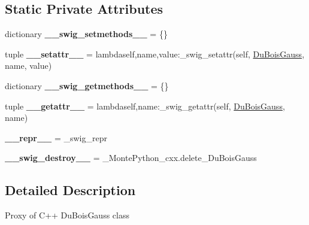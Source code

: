 \subsection*{Static Private Attributes}
\begin{DoxyCompactItemize}
\item 
\hypertarget{classMontePython__cxx_1_1DuBoisGauss_a433eaf202c7a171fb7498e6e7e54da9a}{}dictionary {\bfseries \+\_\+\+\_\+swig\+\_\+setmethods\+\_\+\+\_\+} = \{\}\label{classMontePython__cxx_1_1DuBoisGauss_a433eaf202c7a171fb7498e6e7e54da9a}

\item 
\hypertarget{classMontePython__cxx_1_1DuBoisGauss_a89306da6dc501c11a27108b24e1edf35}{}tuple {\bfseries \+\_\+\+\_\+setattr\+\_\+\+\_\+} = lambdaself,name,value\+:\+\_\+swig\+\_\+setattr(self, \hyperlink{classMontePython__cxx_1_1DuBoisGauss}{Du\+Bois\+Gauss}, name, value)\label{classMontePython__cxx_1_1DuBoisGauss_a89306da6dc501c11a27108b24e1edf35}

\item 
\hypertarget{classMontePython__cxx_1_1DuBoisGauss_ad886a66d3ab5c237fe5ac7d55e07e958}{}dictionary {\bfseries \+\_\+\+\_\+swig\+\_\+getmethods\+\_\+\+\_\+} = \{\}\label{classMontePython__cxx_1_1DuBoisGauss_ad886a66d3ab5c237fe5ac7d55e07e958}

\item 
\hypertarget{classMontePython__cxx_1_1DuBoisGauss_aa8ae51d7234ced5c0ec8c2ac099fd9fc}{}tuple {\bfseries \+\_\+\+\_\+getattr\+\_\+\+\_\+} = lambdaself,name\+:\+\_\+swig\+\_\+getattr(self, \hyperlink{classMontePython__cxx_1_1DuBoisGauss}{Du\+Bois\+Gauss}, name)\label{classMontePython__cxx_1_1DuBoisGauss_aa8ae51d7234ced5c0ec8c2ac099fd9fc}

\item 
\hypertarget{classMontePython__cxx_1_1DuBoisGauss_afd54d91061c53cbc7e226c2a263affea}{}{\bfseries \+\_\+\+\_\+repr\+\_\+\+\_\+} = \+\_\+swig\+\_\+repr\label{classMontePython__cxx_1_1DuBoisGauss_afd54d91061c53cbc7e226c2a263affea}

\item 
\hypertarget{classMontePython__cxx_1_1DuBoisGauss_acbf285cdd4ad5fb5e1b578e9f1328d20}{}{\bfseries \+\_\+\+\_\+swig\+\_\+destroy\+\_\+\+\_\+} = \+\_\+\+Monte\+Python\+\_\+cxx.\+delete\+\_\+\+Du\+Bois\+Gauss\label{classMontePython__cxx_1_1DuBoisGauss_acbf285cdd4ad5fb5e1b578e9f1328d20}

\end{DoxyCompactItemize}


\subsection{Detailed Description}
\begin{DoxyVerb}Proxy of C++ DuBoisGauss class\end{DoxyVerb}
 

